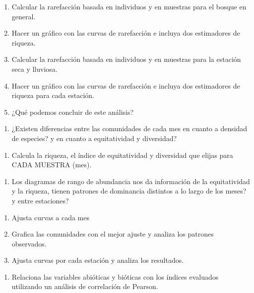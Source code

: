 \documentclass[]{book}
\providecommand{\tightlist}{%
  \setlength{\itemsep}{0pt}\setlength{\parskip}{0pt}}
\begin{document}
\begin{enumerate}
\def\labelenumi{\alph{enumi}.}
\tightlist
\item
  Calcular la rarefacción basada en individuos y en muestras para el
  bosque en general.
\item
  Hacer un gráfico con las curvas de rarefacción e incluya dos
  estimadores de riqueza.
\item
  Calcular la rarefacción basada en individuos y en muestras para la
  estación seca y lluviosa.
\item
  Hacer un gráfico con las curvas de rarefacción e incluya dos
  estimadores de riqueza para cada estación.
\item
  ¿Qué podemos concluir de este análisis?
\end{enumerate}

\begin{enumerate}
\def\labelenumi{\arabic{enumi}.}
\setcounter{enumi}{3}
\tightlist
\item
  ¿Existen diferencias entre las comunidades de cada mes en cuanto a
  densidad de especies? y en cuanto a equitatividad y diversidad?
\end{enumerate}

\begin{enumerate}
\def\labelenumi{\alph{enumi}.}
\tightlist
\item
  Calcula la riqueza, el índice de equitatividad y diversidad que elijas
  para CADA MUESTRA (mes).
\end{enumerate}

\begin{enumerate}
\def\labelenumi{\arabic{enumi}.}
\setcounter{enumi}{4}
\tightlist
\item
  Los diagramas de rango de abundancia nos da información de la
  equitatividad y la riqueza, tienen patrones de dominancia distintos a
  lo largo de los meses? y entre estaciones?
\end{enumerate}

\begin{enumerate}
\def\labelenumi{\alph{enumi}.}
\tightlist
\item
  Ajusta curvas a cada mes
\item
  Grafica las comunidades con el mejor ajuste y analiza los patrones
  observados.
\item
  Ajusta curvas por cada estación y analiza los resultados.
\end{enumerate}

\begin{enumerate}
\def\labelenumi{\arabic{enumi}.}
\setcounter{enumi}{5}
\tightlist
\item
  Relaciona las variables abióticas y bióticas con los índices evaluados
  utilizando un análisis de correlación de Pearson.
\end{enumerate}
\end{document}
